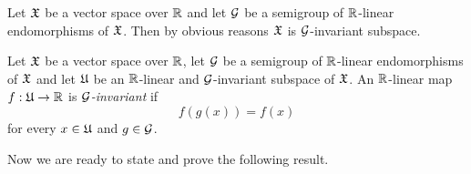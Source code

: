 \begin{remark}\label{remark:whole_space_is_invariant}
Let ${\mathfrak X}$ be a vector space over ${\mathbb R}$ and let ${\mathcal G}$ be a semigroup of ${\mathbb R}$-linear endomorphisms of ${\mathfrak X}$. Then by obvious reasons ${\mathfrak X}$ is ${\mathcal G}$-invariant subspace.
\end{remark}

\begin{definition}
Let ${\mathfrak X}$ be a vector space over ${\mathbb R}$, let ${\mathcal G}$ be a semigroup of ${\mathbb R}$-linear endomorphisms of ${\mathfrak X}$ and let ${\mathfrak U}$ be an ${\mathbb R}$-linear and ${\mathcal G}$-invariant subspace of ${\mathfrak X}$. An ${\mathbb R}$-linear map $f:{\mathfrak U}\rightarrow {\mathbb R}$ is \textit{${\mathcal G}$-invariant} if
$$f\left(g(x)\right) = f(x)$$
for every $x\in {\mathfrak U}$ and $g\in {\mathcal G}$.
\end{definition}
\noindent
Now we are ready to state and prove the following result.

